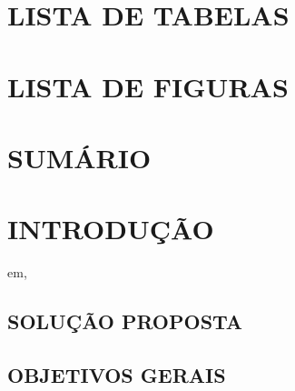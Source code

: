 \documentclass[12pt,a4paper]{article}
\begin{document}
	\section*{LISTA DE TABELAS}

	\listoftables

	\newpage

	\thispagestyle{empty}
	\section*{LISTA DE FIGURAS}

	\listoffigures

	\newpage



	\thispagestyle{empty}
	\section*{SUMÁRIO}

	\begingroup
		\let\clearpage\relax
		\vspace{-1cm} %
		\tableofcontents
	\endgroup

	\newpage


	\section{INTRODUÇÃO}
em,
		\lipsum[1]

		\subsection{SOLUÇÃO PROPOSTA}

			\lipsum[1]


		\subsection{OBJETIVOS GERAIS}

			\lipsum[1]
\end{document}
